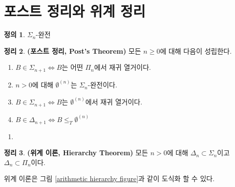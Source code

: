 \documentclass[b5paper, 11pt]{book}
\theoremstyle{definition}
\newtheorem{defn}{정의}[chapter]
\newtheorem{thm}[defn]{정리}
\newenvironment{pf*}{\pushQED{\qed}\pf}
{\popQED\endpf}
\begin{document}
\section{포스트 정리와 위계 정리}
\begin{defn}
    $\Sigma_n$-완전
\end{defn}
\begin{thm}
    \textbf{(포스트 정리, Post's Theorem)} 모든 $n \ge 0$에 대해 다음이 성립한다.
    \begin{enumerate}
        \item $B \in \Sigma_{n+1} \Leftrightarrow B$는 어떤 $\Pi_n$에서 재귀 열거이다.
        \item $n > 0$에 대해 $\emptyset^{(n)}$는 $\Sigma_n$-완전이다.
        \item $B \in \Sigma_{n+1} \Leftrightarrow B$는 $\emptyset^{(n)}$에서 재귀 열거이다.
        \item $B \in \Delta_{n+1} \Leftrightarrow B \le_T \emptyset^{(n)}$  
    \end{enumerate}
\end{thm}
\begin{pf*}
    \begin{enumerate}
        \item 
    \end{enumerate}
\end{pf*}
\begin{thm}
    \textbf{(위계 이론, Hierarchy Theorem)} 모든 $n > 0$에 대해 $\Delta_n \subset \Sigma_n$이고 $\Delta_n \subset \Pi_n$이다. 
\end{thm}
위계 이론은 그림 \ref{arithmetic hierarchy figure}과 같이 도식화 할 수 있다.
\end{document}
